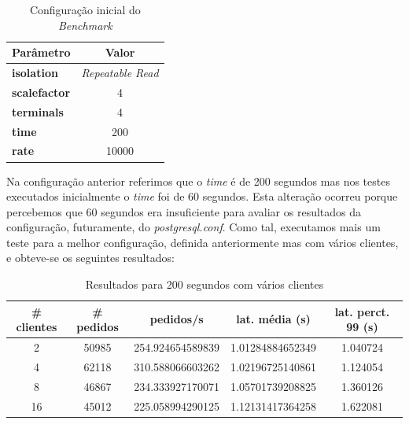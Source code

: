 \begin{table}[!h]
\center
\small
\begin{tabular}{|l|c|}
\hline
\textbf{Parâmetro} & \textbf{Valor} \\ \hline
\textbf{isolation} & \textit{Repeatable Read} \\ \hline
\textbf{scalefactor} & 4  \\ \hline
\textbf{terminals} & 4  \\ \hline
\textbf{time} & 200  \\ \hline
\textbf{rate} & 10000  \\ \hline
\end{tabular}
\caption{Configuração inicial do \textit{Benchmark}}
\end{table}

Na configuração anterior referimos que o \textit{time} é de 200 segundos mas nos testes executados inicialmente o \textit{time} foi de 60 segundos. Esta alteração ocorreu porque percebemos que 60 segundos era insuficiente para avaliar os resultados da configuração, futuramente, do \textit{postgresql.conf}. Como tal, executamos mais um teste para a melhor configuração, definida anteriormente mas com vários clientes, e obteve-se os seguintes resultados:

\begin{table}[!h]
\center
\small
\begin{tabular}{|c|c|c|c|c|}
\hline
\textbf{\# clientes} & \textbf{\# pedidos} & \textbf{pedidos/s} & \textbf{lat. média (s)} & \textbf{lat. perct. 99 (s)}  \\ \hline
2 & 50985 & 254.924654589839 & 1.01284884652349 & 1.040724  \\ \hline
4 & 62118 & 310.588066603262 & 1.02196725140861 & 1.124054  \\ \hline
8 & 46867 & 234.333927170071 & 1.05701739208825 & 1.360126  \\ \hline
16 & 45012 & 225.058994290125 & 1.12131417364258 & 1.622081  \\ \hline
\end{tabular}
\caption{Resultados para 200 segundos com vários clientes}
\end{table}

